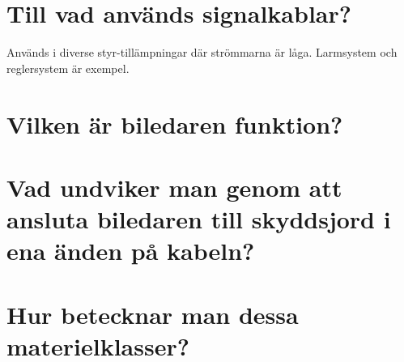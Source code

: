 \documentclass[a4paper,swedish]{article}
\begin{document}
\setcounter{section}{26}
\section{Till vad används signalkablar?}

Används i diverse styr-tillämpningar där strömmarna är låga.
Larmsystem och reglersystem är exempel.

\setcounter{section}{28}
\section{Vilken är biledaren funktion?}

\setcounter{section}{30}
\section{Vad undviker man genom att ansluta biledaren till skyddsjord i ena änden på
kabeln?}

\setcounter{section}{32}
\section{Hur betecknar man dessa materielklasser?}
\end{document}
